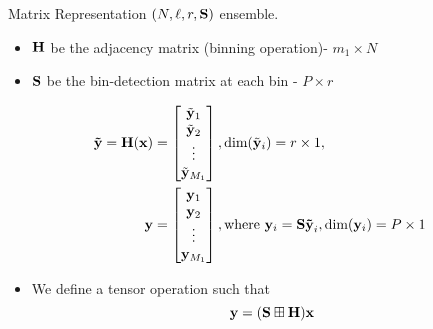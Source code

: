 
\begin{frame}{Matrix Representation}
$(N,\ell,r,\mathbf{S})$ ensemble. 
\begin{itemize}
\item $\mathbf{H}$ be the adjacency matrix (binning operation)- $m_1 \times N$
\item $\mathbf{S}$ be the bin-detection matrix at each bin - $P \times r$
\end{itemize}
\begin{align*}
\mbf{\tilde{y}=H(x)}&= 
\begin{bmatrix}
   \tilde{\mbf{ y}}_{1} \\
   \tilde{ \mbf{y}}_{2} \\
    \vdots \\
   \tilde{\mbf{y}}_{M_1}
\end{bmatrix}
,\text{dim}(\tilde{\mbf{y}}_{i} )=r \times 1,
\\
\vspace{10pt}
\mbf{y}&= 
\begin{bmatrix}
   \mbf{ y}_{1}\\
    \mbf{y}_{2}  \\
    \vdots \\
    \mbf{y}_{M_1}
\end{bmatrix}
, \text{where } \mbf{y}_i= \mbf{S \tilde{y}}_{i}, \text{dim} (\mbf{y}_i)=P \times 1   
\end{align*}
\begin{itemize}
\item We define a tensor operation such that 
\begin{equation*}
\mathbf{y=(S\boxplus H)  x}
\end{equation*}
\end{itemize}
\end{frame}

